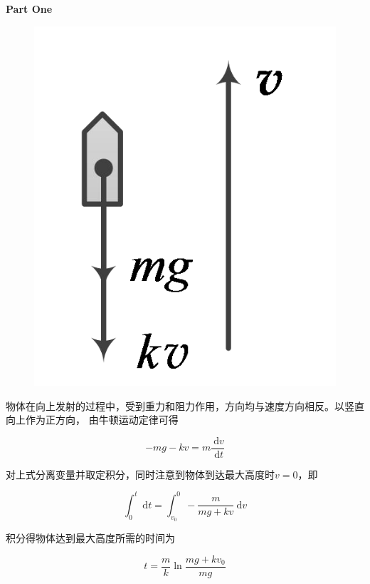\documentclass[
	12pt, %
	a4paper, %
]{myLegrandOrangeBook}
\begin{document}
    \textbf{Part One}
    \\

    \begin{figure}
        \centering
        \includegraphics[scale=0.3]{"Chapter 02 images/pic4.png"}
        \label{pic4}
    \end{figure}

    物体在向上发射的过程中，受到重力和阻力作用，方向均与速度方向相反。以竖直向上作为正方向，
    由牛顿运动定律可得

    \begin{equation}
        -m g-k v=m \frac{\mathrm{~d} v}{\mathrm{~d} t}
        \label{Problem-2-1}
    \end{equation}

    对上式分离变量并取定积分，同时注意到物体到达最大高度时\(v=0\)，即

    $$
        \int_0^t \mathrm{~d} t=\int_{v_0}^0-\frac{m}{m g+k v} \mathrm{~d} v
    $$

    积分得物体达到最大高度所需的时间为

    $$
        t=\frac{m}{k} \ln \frac{m g+k v_0}{m g}
    $$
\end{document}
